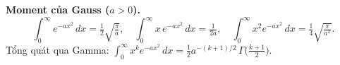 \textbf{Moment của Gauss ($a>0$).}
$$\int_0^{\infty} e^{-ax^2}\,dx=\tfrac12\sqrt{\tfrac{\pi}{a}},\quad
\int_0^{\infty} x\,e^{-ax^2}\,dx=\tfrac{1}{2a},\quad
\int_0^{\infty} x^2 e^{-ax^2}\,dx=\tfrac{1}{4}\sqrt{\tfrac{\pi}{a^3}}.$$
Tổng quát qua Gamma: $\displaystyle\int_0^\infty x^{k}e^{-ax^2}\,dx=\tfrac{1}{2}a^{-(k+1)/2}\,\Gamma\!\big(\tfrac{k+1}{2}\big).$
